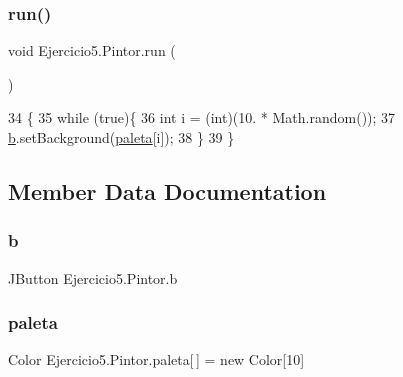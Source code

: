 \subsubsection{\texorpdfstring{run()}{run()}}
{\footnotesize\ttfamily void Ejercicio5.\+Pintor.\+run (\begin{DoxyParamCaption}{ }\end{DoxyParamCaption})\hspace{0.3cm}{\ttfamily [inline]}}


\begin{DoxyCode}
34                      \{
35           \textcolor{keywordflow}{while} (\textcolor{keyword}{true})\{
36             \textcolor{keywordtype}{int} i = (int)(10. * Math.random());
37             \mbox{\hyperlink{class_ejercicio5_1_1_pintor_a470004bc84afaefaee715182d6601df2}{b}}.setBackground(\mbox{\hyperlink{class_ejercicio5_1_1_pintor_a8604057520bcd80da76eb95ac70367a9}{paleta}}[i]);
38         \}
39     \}
\end{DoxyCode}


\subsection{Member Data Documentation}
\mbox{\label{class_ejercicio5_1_1_pintor_a470004bc84afaefaee715182d6601df2}} 
\subsubsection{\texorpdfstring{b}{b}}
{\footnotesize\ttfamily J\+Button Ejercicio5.\+Pintor.\+b\hspace{0.3cm}{\ttfamily [package]}}

\mbox{\label{class_ejercicio5_1_1_pintor_a8604057520bcd80da76eb95ac70367a9}} 
\subsubsection{\texorpdfstring{paleta}{paleta}}
{\footnotesize\ttfamily Color Ejercicio5.\+Pintor.\+paleta\mbox{[}$\,$\mbox{]} = new Color\mbox{[}10\mbox{]}\hspace{0.3cm}{\ttfamily [package]}}

